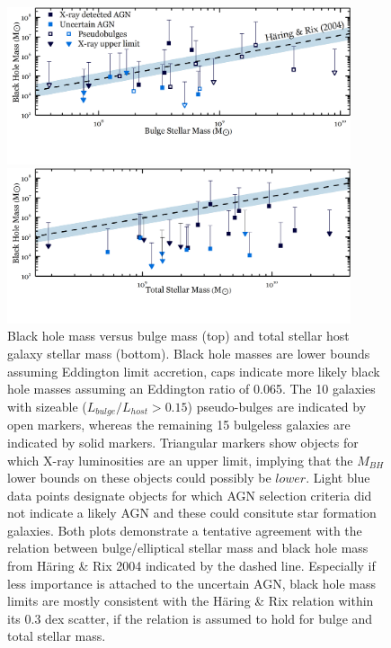 \documentclass[11pt,twocolumn]{article}
\begin{document}
\begin{figure}[!t]
\centering

\vspace{-1em}

\includegraphics[width=0.9\textwidth]{Graph2}

\vspace{-2.8em}

\includegraphics[width=0.9\textwidth]{Graph1_2}
\vspace{-3.5em}
\caption{Black hole mass versus bulge mass (top) and total stellar host galaxy stellar mass (bottom). Black hole masses are lower bounds assuming Eddington limit accretion, caps indicate more likely black hole masses assuming an Eddington ratio of 0.065. The 10 galaxies with sizeable ($L_{bulge}/L_{host} >  0.15$) pseudo-bulges are indicated by open markers, whereas the remaining 15 bulgeless galaxies are indicated by solid markers. Triangular markers show objects for which X-ray luminosities are an upper limit, implying that the $M_{BH}$ lower bounds on these objects could possibly be $lower$.  Light blue data points designate objects for which AGN selection criteria\cite{bla} did not indicate a likely AGN and these could consitute star formation galaxies. Both plots demonstrate a tentative agreement with the relation between bulge/elliptical stellar mass and black hole mass from H\"{a}ring \& Rix 2004 \cite{Haring:2004hr} indicated by the dashed line. Especially if less importance is attached to the uncertain AGN, black hole mass limits are mostly consistent with the H\"{a}ring \& Rix relation within its 0.3 dex scatter, if the relation is assumed to hold for bulge and total stellar mass.  }\label{plot1}
\end{figure}
\end{document}
